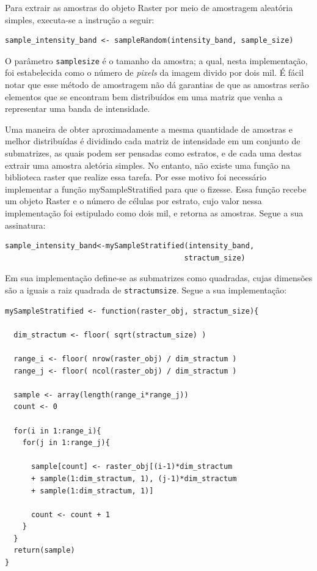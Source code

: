 \documentclass[12pt]{article}
\begin{document}
Para extrair as amostras do objeto Raster por meio de amostragem aleatória simples, executa-se a instrução a seguir:

\begin{verbatim}
sample_intensity_band <- sampleRandom(intensity_band, sample_size)
\end{verbatim}

O parâmetro \texttt{sample\textunderscore size} é o tamanho da amostra; a qual, nesta implementação, foi estabelecida como o número de \textit{pixels} da imagem divido por dois mil. É fácil notar que esse método de amostragem não dá garantias de que as amostras serão elementos que se encontram bem distribuídos em uma matriz que venha a representar uma banda de intensidade. 

Uma maneira de obter aproximadamente a mesma quantidade de amostras e melhor distribuídas é dividindo cada matriz de intensidade em um conjunto de submatrizes, as quais podem ser pensadas como estratos, e de cada uma destas extrair uma amostra aletória simples. No entanto, não existe uma função na biblioteca raster que realize essa tarefa. Por esse motivo foi necessário implementar a função mySampleStratified para que o fizesse. Essa função recebe um objeto Raster e o número de células por estrato, cujo valor nessa implementação foi estipulado como dois mil, e retorna as amostras. Segue a sua assinatura:

\begin{verbatim}
sample_intensity_band<-mySampleStratified(intensity_band,
                                         stractum_size)
\end{verbatim}

Em sua implementação define-se as submatrizes como quadradas, cujas dimensões são a iguais a raiz quadrada de \texttt{stractum}\textunderscore\texttt{size}. Segue a sua implementação:

\begin{verbatim}
mySampleStratified <- function(raster_obj, stractum_size){
  
  dim_stractum <- floor( sqrt(stractum_size) )
  
  range_i <- floor( nrow(raster_obj) / dim_stractum )
  range_j <- floor( ncol(raster_obj) / dim_stractum )
  
  sample <- array(length(range_i*range_j))
  count <- 0
  
  for(i in 1:range_i){
    for(j in 1:range_j){
     
      sample[count] <- raster_obj[(i-1)*dim_stractum 
      + sample(1:dim_stractum, 1), (j-1)*dim_stractum
      + sample(1:dim_stractum, 1)]
      
      count <- count + 1  
    }
  }
  return(sample)
}
\end{verbatim}
\end{document}
